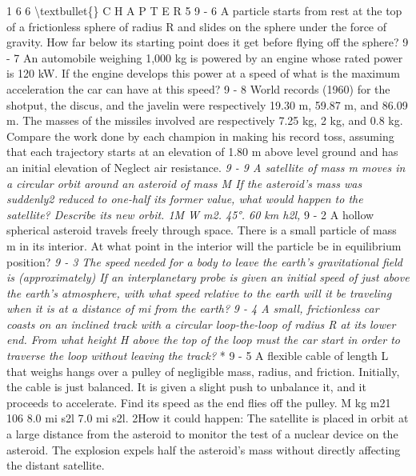 \documentclass[10pt,oneside]{article}
\begin{document}
1 6 6 \textbackslash{}textbullet\{\} C H A P T E R  5 \emph{ } 9 - 6 A particle starts from rest at the top of a frictionless sphere of radius R and slides on the sphere under the force of gravity. How far below its starting point does it get before flying off the sphere? \emph{ } 9 - 7 An automobile weighing 1,000 kg is powered by an engine whose rated power is 120 kW. If the engine develops this power at a speed of what is the maximum acceleration the car can have at this speed? \emph{ } 9 - 8 World records (1960) for the shotput, the discus, and the javelin were respectively 19.30 m, 59.87 m, and 86.09 m. The masses of the missiles involved are respectively 7.25 kg, 2 kg, and 0.8 kg. Compare the work done by each champion in making his record toss, assuming that each trajectory starts at an elevation of 1.80 m above level ground and has an initial elevation of Neglect air resistance. \emph{ } \emph{ 9 - 9 A satellite of mass m moves in a circular orbit around an asteroid of mass M If the asteroid’s mass was suddenly2 reduced to one-half its former value, what would happen to the satellite? Describe its new orbit. 1M W m2. 45°. 60 km h2l, } 9 - 2 A hollow spherical asteroid travels freely through space. There is a small particle of mass m in its interior. At what point in the interior will the particle be in equilibrium position? \emph{ 9 - 3 The speed needed for a body to leave the earth’s gravitational field is (approximately) If an interplanetary probe is given an initial speed of just above the earth’s atmosphere, with what speed relative to the earth will it be traveling when it is at a distance of mi from the earth? } \emph{ 9 - 4 A small, frictionless car coasts on an inclined track with a circular loop-the-loop of radius R at its lower end. From what height H above the top of the loop must the car start in order to traverse the loop without leaving the track? } * 9 - 5 A flexible cable of length L that weighs hangs over a pulley of negligible mass, radius, and friction. Initially, the cable is just balanced. It is given a slight push to unbalance it, and it proceeds to accelerate. Find its speed as the end flies off the pulley. M kg m21 106 8.0 mi s2l 7.0 mi s2l. 2How it could happen: The satellite is placed in orbit at a large distance from the asteroid to monitor the test of a nuclear device on the asteroid. The explosion expels half the asteroid’s mass without directly affecting the distant satellite.\par
\end{document}
